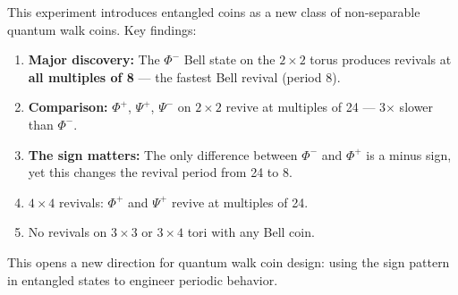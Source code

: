 This experiment introduces entangled coins as a new class of
non-separable quantum walk coins. Key findings:

\begin{enumerate}
    \item \textbf{Major discovery:} The $\Phi^-$ Bell state on the
          $2 \times 2$ torus produces revivals at \textbf{all multiples
          of 8} --- the fastest Bell revival (period 8).
    \item \textbf{Comparison:} $\Phi^+$, $\Psi^+$, $\Psi^-$ on
          $2 \times 2$ revive at multiples of 24 --- 3$\times$ slower
          than $\Phi^-$.
    \item \textbf{The sign matters:} The only difference between
          $\Phi^-$ and $\Phi^+$ is a minus sign, yet this changes the
          revival period from 24 to 8.
    \item $4 \times 4$ revivals: $\Phi^+$ and $\Psi^+$ revive at
          multiples of 24.
    \item No revivals on $3 \times 3$ or $3 \times 4$ tori with any
          Bell coin.
\end{enumerate}

This opens a new direction for quantum walk coin design: using the
sign pattern in entangled states to engineer periodic behavior.
